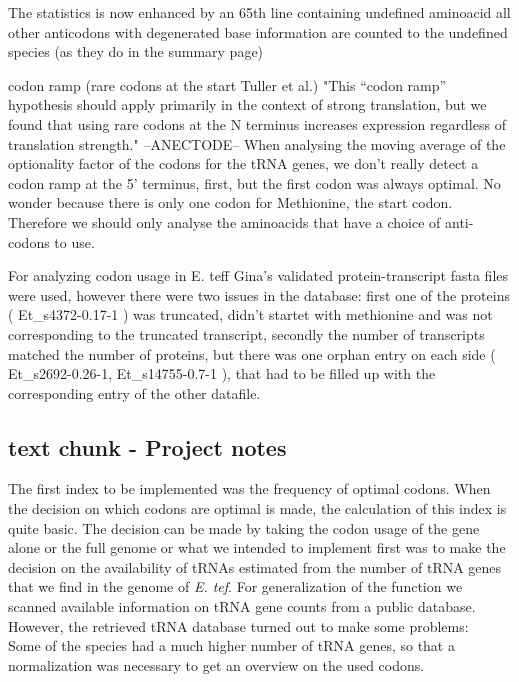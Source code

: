 The statistics is now enhanced by an 65th line containing undefined aminoacid all other anticodons with degenerated base information are counted to the undefined species (as they do in the summary page)

codon ramp (rare codons at the start Tuller et al.) "This “codon ramp” hypothesis should apply primarily in the context of strong translation, but we found that using rare codons at the N terminus increases expression regardless of translation strength." --ANECTODE-- When analysing the moving average of the optionality factor of the codons for the tRNA genes, we don't really detect a codon ramp at the 5' terminus, first, but the first codon was always optimal. No wonder because there is only one codon for Methionine, the start codon. Therefore we should only analyse the aminoacids that have a choice of anti-codons to use.  

For analyzing codon usage in E. teff Gina's validated protein-transcript fasta files were used, however there were two issues in the database: 
first one of the proteins (
Et\_s4372-0.17-1
) was truncated, didn't startet with methionine and was not corresponding to the truncated transcript, secondly the number of transcripts matched the number of proteins, but there was one orphan entry on each side (
Et\_s2692-0.26-1, Et\_s14755-0.7-1
), that had to be filled up with the corresponding entry of the other datafile. 


\subsection{text chunk - Project notes}
The first index to be implemented was the frequency of optimal codons. When the decision on which codons are optimal is made, the calculation of this index is quite basic. The decision can be made by taking the codon usage of the gene alone or the full genome or what we intended to implement first was to make the decision on the availability of tRNAs estimated from the number of tRNA genes that we find in the genome of \textit{E. tef}. For generalization of the function we scanned available information on tRNA gene counts from a public database. However, the retrieved tRNA database turned out to make some problems: \\
Some of the species had a much higher number of tRNA genes, so that a normalization was necessary to get an overview on the used codons. %

